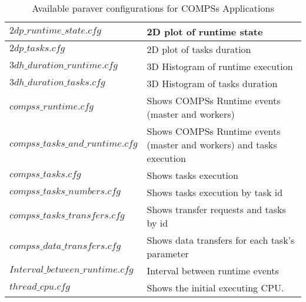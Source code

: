 \bgroup
  \def\arraystretch{1.5}
  \begin{table}[h]
    \begin{center}
      \begin{tabular}{| p{} | p{} |}
	\hline
	$2dp\_runtime\_state.cfg$		& 2D plot of runtime state \\ \hline
	$2dp\_tasks.cfg$			& 2D plot of tasks duration \\ \hline
	$3dh\_duration\_runtime.cfg$		& 3D Histogram of runtime execution \\ \hline
	$3dh\_duration\_tasks.cfg$		& 3D Histogram of tasks duration \\ \hline
	$compss\_runtime.cfg$ 			& Shows COMPSs Runtime events (master and workers) \\ \hline
	$compss\_tasks\_and\_runtime.cfg$ 	& Shows COMPSs Runtime events (master and workers) and tasks execution \\ \hline
	$compss\_tasks.cfg$ 			& Shows tasks execution \\ \hline
	$compss\_tasks\_numbers.cfg$ 		& Shows tasks execution by task id \\ \hline
	$compss\_tasks\_transfers.cfg$ 		& Shows transfer requests and tasks by id \\ \hline
	$compss\_data\_transfers.cfg$ 		& Shows data transfers for each task's parameter \\ \hline
	$Interval\_between\_runtime.cfg$ 	& Interval between runtime events \\ \hline
	$thread\_cpu.cfg$			& Shows the initial executing CPU. \\ \hline
      \end{tabular}
      \caption{Available paraver configurations for COMPSs Applications}
      \label{tab:paraver_configs}
    \end{center}
  \end{table}
\egroup

